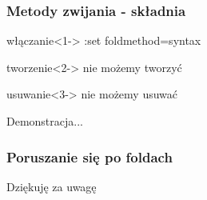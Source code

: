 \documentclass{beamer}
\begin{document}
\begin{frame}
	\frametitle{Metody zwijania - składnia}
	\begin{block}{włączanie}<1->
	:set foldmethod=syntax
	\end{block}
	\begin{block}{tworzenie}<2->
	nie możemy tworzyć
	\end{block}
	\begin{block}{usuwanie}<3->
	nie możemy usuwać
	\end{block}
	{
		Demonstracja...
	}
\end{frame}
\begin{frame}
	\frametitle{Poruszanie się po foldach}
\end{frame}
\begin{frame}
	Dziękuję za uwagę
\end{frame}
\end{document}
